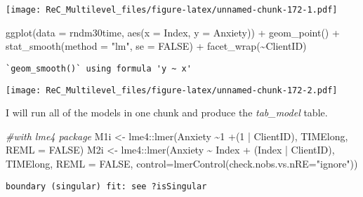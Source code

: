 \documentclass[
  11pt,
]{book}
\newenvironment{Shaded}{\begin{snugshade}}{\end{snugshade}}
\newcommand{\AttributeTok}[1]{\textcolor[rgb]{0.77,0.63,0.00}{#1}}
\newcommand{\CommentTok}[1]{\textcolor[rgb]{0.56,0.35,0.01}{\textit{#1}}}
\newcommand{\ConstantTok}[1]{\textcolor[rgb]{0.00,0.00,0.00}{#1}}
\newcommand{\DecValTok}[1]{\textcolor[rgb]{0.00,0.00,0.81}{#1}}
\newcommand{\FunctionTok}[1]{\textcolor[rgb]{0.00,0.00,0.00}{#1}}
\newcommand{\NormalTok}[1]{#1}
\newcommand{\OtherTok}[1]{\textcolor[rgb]{0.56,0.35,0.01}{#1}}
\newcommand{\SpecialCharTok}[1]{\textcolor[rgb]{0.00,0.00,0.00}{#1}}
\newcommand{\StringTok}[1]{\textcolor[rgb]{0.31,0.60,0.02}{#1}}
\begin{document}
\texttt{[image: ReC\_Multilevel\_files/figure-latex/unnamed-chunk-172-1.pdf]}

\begin{Shaded}
\begin{Highlighting}[]
\FunctionTok{ggplot}\NormalTok{(}\AttributeTok{data =}\NormalTok{ rndm30time, }\FunctionTok{aes}\NormalTok{(}\AttributeTok{x =}\NormalTok{ Index, }\AttributeTok{y =}\NormalTok{ Anxiety)) }\SpecialCharTok{+} \FunctionTok{geom\_point}\NormalTok{() }\SpecialCharTok{+}
    \FunctionTok{stat\_smooth}\NormalTok{(}\AttributeTok{method =} \StringTok{"lm"}\NormalTok{, }\AttributeTok{se =} \ConstantTok{FALSE}\NormalTok{) }\SpecialCharTok{+} \FunctionTok{facet\_wrap}\NormalTok{(}\SpecialCharTok{\textasciitilde{}}\NormalTok{ClientID)}
\end{Highlighting}
\end{Shaded}

\begin{verbatim}
`geom_smooth()` using formula 'y ~ x'
\end{verbatim}

\texttt{[image: ReC\_Multilevel\_files/figure-latex/unnamed-chunk-172-2.pdf]}

I will run all of the models in one chunk and produce the \emph{tab\_model} table.

\begin{Shaded}
\begin{Highlighting}[]
\CommentTok{\#with lme4 package}
\NormalTok{M1i }\OtherTok{\textless{}{-}}\NormalTok{ lme4}\SpecialCharTok{::}\FunctionTok{lmer}\NormalTok{(Anxiety }\SpecialCharTok{\textasciitilde{}}\DecValTok{1} \SpecialCharTok{+}\NormalTok{(}\DecValTok{1} \SpecialCharTok{|}\NormalTok{ ClientID), TIMElong, }\AttributeTok{REML =} \ConstantTok{FALSE}\NormalTok{)}
\NormalTok{M2i }\OtherTok{\textless{}{-}}\NormalTok{ lme4}\SpecialCharTok{::}\FunctionTok{lmer}\NormalTok{(Anxiety }\SpecialCharTok{\textasciitilde{}}\NormalTok{ Index }\SpecialCharTok{+}\NormalTok{ (Index }\SpecialCharTok{|}\NormalTok{ ClientID), TIMElong, }\AttributeTok{REML =} \ConstantTok{FALSE}\NormalTok{, }\AttributeTok{control=}\FunctionTok{lmerControl}\NormalTok{(}\AttributeTok{check.nobs.vs.nRE=}\StringTok{"ignore"}\NormalTok{))}
\end{Highlighting}
\end{Shaded}

\begin{verbatim}
boundary (singular) fit: see ?isSingular
\end{verbatim}
\end{document}
